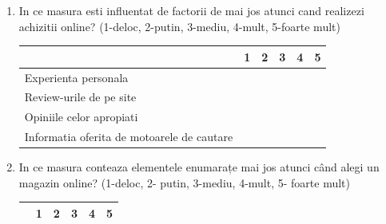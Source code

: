 \documentclass[a4paper, 12pt]{article}
\begin{document}
\begin{enumerate}
	\item In ce masura esti influentat de factorii de mai jos atunci cand realizezi achizitii online? (1-deloc, 2-putin, 3-mediu, 4-mult, 5-foarte mult) 
	\begin{center}
		\begin{tabular}{ | m{19em} | m{1cm}| m{1cm} | m{1cm}| m{1cm} | m{1cm} |} 
			\hline
			& 1 & 2 & 3 & 4 & 5\\ 
			\hline
			Experienta personala  &  &  &  & & \\ 
			\hline
			Review-urile de pe site  &  &   &  &  &\\ 
			\hline
			Opiniile celor apropiati &  &   &  & & \\ 
			\hline
			Informatia oferita de motoarele de cautare &  &  &  & & \\ 
			\hline
		\end{tabular}
\newline
	\end{center}
	\item In ce masura conteaza elementele enumarațe mai jos atunci când alegi un magazin online? (1-deloc, 2- putin, 3-mediu, 4-mult, 5- foarte mult) 
	\begin{center}
		\begin{tabular}{ | m{19em} | m{1cm}| m{1cm} | m{1cm}| m{1cm} | m{1cm} |} 
			\hline
			& 1 & 2 & 3 & 4 & 5\\ 
			\hline
		

\end{tabular}
\end{center}
\end{enumerate}
\end{document}
